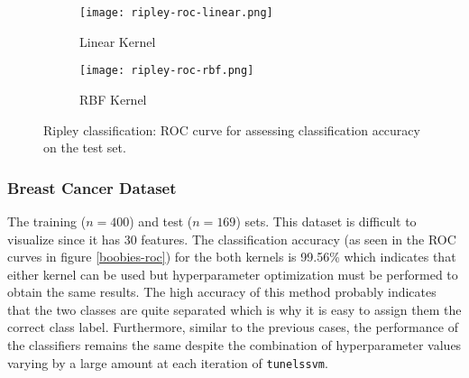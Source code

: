 \documentclass[paper=a4, fontsize=11pt]{scrartcl} %
\numberwithin{equation}{section} %
\begin{document}
\begin{figure}[ht]
\centering
	\begin{subfigure}[b]{0.5\textwidth}
		\centering
		\texttt{[image: ripley-roc-linear.png]}
		\caption{Linear Kernel}
	\end{subfigure}%
	\begin{subfigure}[b]{0.5\textwidth}
		\centering
		\texttt{[image: ripley-roc-rbf.png]}
		\caption{RBF Kernel}
	\end{subfigure}
\caption{Ripley classification: ROC curve for assessing classification accuracy on the test set.}
\label{ripley-roc}
\end{figure}

\subsubsection{Breast Cancer Dataset}

The training ($n = 400$) and test ($n = 169$) sets. This dataset is difficult to visualize since it has 30 features. The classification accuracy (as seen in the ROC curves in figure \ref{boobies-roc}) for the both kernels is 99.56\% which indicates that either kernel can be used but hyperparameter optimization must be performed to obtain the same results. The high accuracy of this method probably indicates that the two classes are quite separated which is why it is easy to assign them the correct class label. Furthermore, similar to the previous cases, the performance of the classifiers remains the same despite the combination of hyperparameter values varying by a large amount at each iteration of \texttt{tunelssvm}.

\begin{comment}
\begin{figure}[ht]
\centering
	\begin{subfigure}[b]{0.5\textwidth}
		\centering
		\texttt{[image: breast-train.png]}
		\caption{Training set}
	\end{subfigure}%
	\begin{subfigure}[b]{0.5\textwidth}
		\centering
		\texttt{[image: breast-test.png]}
		\caption{Test set}
	\end{subfigure}
\caption{Breast cancer classification: Training and test data. Only the first two features are plotted since the whole dataset resides in a 30 dimensional (feature) space which cannot be visualized.}
\label{boobies-data}
\end{figure}
\end{comment}
\end{document}

